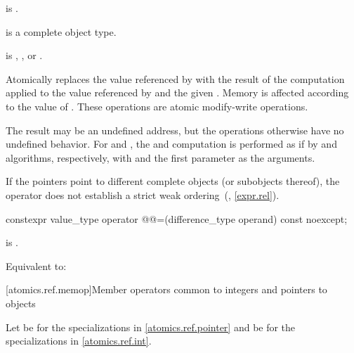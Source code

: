 \begin{itemdescr}
\pnum
\constraints
{} is .

\pnum
\mandates
{} is a complete object type.

\pnum
\expects
{} is ,
, or
.

\pnum
\effects
Atomically replaces the value referenced by 
with the result of the computation applied to
the value referenced by  and the given .
Memory is affected according to the value of .
These operations are atomic modify-write operations.

\pnum
\remarks
The result may be an undefined address,
but the operations otherwise have no undefined behavior.
For  and ,
the  and  computation is performed
as if by  and  algorithms, respectively,
with  and the first parameter as the arguments.
\begin{note}
If the pointers point to different complete objects (or subobjects thereof),
the \tcode{<} operator does not establish
a strict weak ordering~(, \ref{expr.rel}).
\end{note}
\end{itemdescr}

%
%
\begin{itemdecl}
constexpr value_type operator @@=(difference_type operand) const noexcept;
\end{itemdecl}

\begin{itemdescr}
\pnum
\constraints
{} is .

\pnum
\effects
Equivalent to:
\end{itemdescr}

[atomics.ref.memop]{Member operators
                          common to integers and pointers to objects}

\pnum
Let 
be 
for the specializations in \ref{atomics.ref.pointer} and
be 
for the specializations in \ref{atomics.ref.int}.


